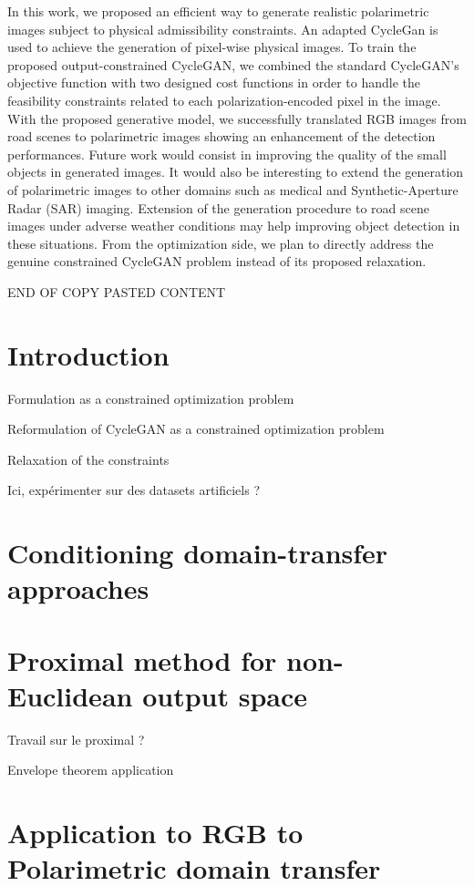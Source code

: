 In this work, we proposed an efficient way to generate realistic polarimetric images subject to physical admissibility constraints. An adapted CycleGan is used to achieve the generation of pixel-wise physical images. To train the proposed output-constrained CycleGAN, we combined the standard CycleGAN's objective function with two designed cost functions in order to handle the feasibility constraints related to each polarization-encoded pixel in the image. 
With the proposed generative model, we successfully translated RGB images from road scenes to polarimetric images showing an enhancement of the detection performances.
Future work would consist in improving the quality of the small objects in generated images. It would also be interesting to extend the generation of polarimetric images to other domains such as medical and Synthetic-Aperture Radar (SAR) imaging. Extension of the generation procedure to road scene images under adverse weather conditions may help improving object detection in these situations. From the optimization side, we plan to directly address the genuine constrained CycleGAN problem instead of its proposed relaxation. 

{\Huge END OF COPY PASTED CONTENT}


\minitoc

\section{Introduction}
Formulation as a constrained optimization problem

Reformulation of CycleGAN as a constrained optimization problem 

Relaxation of the constraints

Ici, expérimenter sur des datasets artificiels ?

\section{Conditioning domain-transfer approaches}

\section{Proximal method for non-Euclidean output space}
Travail sur le proximal ?

Envelope theorem application

\section{Application to RGB to Polarimetric domain transfer}

